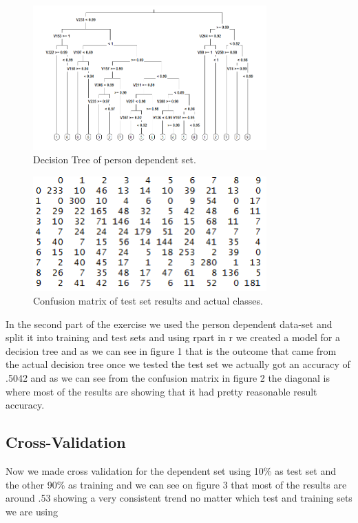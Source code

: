 \documentclass[paper=a4, fontsize=11pt]{scrartcl} %
\begin{document}
\begin{figure}[h]
	\centering
	\includegraphics[width=0.8\textwidth]{figures/decisionTree.png}
	\caption{Decision Tree of person dependent set.}
	\label{fig:scree}
\end{figure}

\begin{figure}[h]
	\centering
	\includegraphics[width=0.8\textwidth]{figures/confusionMatrix.PNG}
	\caption{Confusion matrix of test set results and actual classes.}
	\label{fig:scree}
\end{figure}


In the second part of the exercise we used the person dependent data-set and split it into training and test sets and using rpart in r we created a model for a decision tree and as we can see in figure 1 that is the outcome that came from the actual decision tree once we tested the test set we actually got an accuracy of .5042 and as we can see from the confusion matrix in figure 2 the diagonal is where most of the results are showing that it had pretty reasonable result accuracy.


\clearpage
\subsection{Cross-Validation}
Now we made cross validation for the dependent set using 10\% as test set and the other 90\% as training and we can see on figure 3 that most of the results are around .53 showing a very consistent trend no matter which test and training sets we are using
\end{document}

